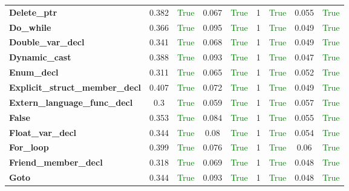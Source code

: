 \documentclass{article}
\begin{document}
\begin{xltabular}{\textwidth}{lcccccccc}
\textbf{{\fontsize{10}{12}\selectfont Delete\_ptr}}& 0.382&\textcolor{green}{True}& 0.067&\textcolor{green}{True}& 1&\textcolor{green}{True}& 0.055&\textcolor{green}{True} \\[0.5ex]
\textbf{{\fontsize{10}{12}\selectfont Do\_while}}& 0.366&\textcolor{green}{True}& 0.095&\textcolor{green}{True}& 1&\textcolor{green}{True}& 0.049&\textcolor{green}{True} \\[0.5ex]
\textbf{{\fontsize{10}{12}\selectfont Double\_var\_decl}}& 0.341&\textcolor{green}{True}& 0.068&\textcolor{green}{True}& 1&\textcolor{green}{True}& 0.049&\textcolor{green}{True} \\[0.5ex]
\textbf{{\fontsize{10}{12}\selectfont Dynamic\_cast}}& 0.388&\textcolor{green}{True}& 0.093&\textcolor{green}{True}& 1&\textcolor{green}{True}& 0.047&\textcolor{green}{True} \\[0.5ex]
\textbf{{\fontsize{10}{12}\selectfont Enum\_decl}}& 0.311&\textcolor{green}{True}& 0.065&\textcolor{green}{True}& 1&\textcolor{green}{True}& 0.052&\textcolor{green}{True} \\[0.5ex]
\textbf{{\fontsize{10}{12}\selectfont Explicit\_struct\_member\_decl}}& 0.407&\textcolor{green}{True}& 0.072&\textcolor{green}{True}& 1&\textcolor{green}{True}& 0.049&\textcolor{green}{True} \\[0.5ex]
\textbf{{\fontsize{10}{12}\selectfont Extern\_language\_func\_decl}}& 0.3&\textcolor{green}{True}& 0.059&\textcolor{green}{True}& 1&\textcolor{green}{True}& 0.057&\textcolor{green}{True} \\[0.5ex]
\textbf{{\fontsize{10}{12}\selectfont False}}& 0.353&\textcolor{green}{True}& 0.084&\textcolor{green}{True}& 1&\textcolor{green}{True}& 0.055&\textcolor{green}{True} \\[0.5ex]
\textbf{{\fontsize{10}{12}\selectfont Float\_var\_decl}}& 0.344&\textcolor{green}{True}& 0.08&\textcolor{green}{True}& 1&\textcolor{green}{True}& 0.054&\textcolor{green}{True} \\[0.5ex]
\textbf{{\fontsize{10}{12}\selectfont For\_loop}}& 0.399&\textcolor{green}{True}& 0.076&\textcolor{green}{True}& 1&\textcolor{green}{True}& 0.06&\textcolor{green}{True} \\[0.5ex]
\textbf{{\fontsize{10}{12}\selectfont Friend\_member\_decl}}& 0.318&\textcolor{green}{True}& 0.069&\textcolor{green}{True}& 1&\textcolor{green}{True}& 0.048&\textcolor{green}{True} \\[0.5ex]
\textbf{{\fontsize{10}{12}\selectfont Goto}}& 0.344&\textcolor{green}{True}& 0.093&\textcolor{green}{True}& 1&\textcolor{green}{True}& 0.048&\textcolor{green}{True} \\[0.5ex]

\end{xltabular}
\end{document}
